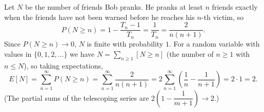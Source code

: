 Let $N$ be the number of friends Bob pranks. He pranks at least $n$ friends exactly when the friends have not been warned before he reaches his $n$-th victim, so
\[P(N\ge n)=1-\dfrac{T_n-1}{T_n}=\dfrac{1}{T_n}=\dfrac{2}{n(n+1)}.\]
Since $P(N\ge n)\to0$, $N$ is finite with probability $1$. For a random variable with values in $\{0,1,2,\dots\}$ we have $N=\sum_{n\ge1}[N\ge n]$ (the number of $n\ge1$ with $n\le N$), so taking expectations,
\[E[N]=\sum_{n=1}^{\infty}P(N\ge n)=\sum_{n=1}^{\infty}\dfrac{2}{n(n+1)}=2\sum_{n=1}^{\infty}\left(\dfrac1n-\dfrac1{n+1}\right)=2\cdot1=\boxed{2}.\]
(The partial sums of the telescoping series are $2\left(1-\dfrac1{m+1}\right)\to2$.)
